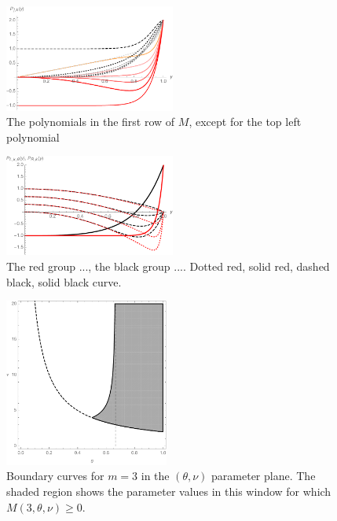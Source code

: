 \documentclass[a4paper]{article}
\newcommand{\te}{\theta}
\begin{document}
\begin{figure}
\begin{center}
\includegraphics[width=0.5\textwidth]{fig_excepttopleft.pdf}
\caption{The polynomials in the first row of $M$, except for the top left polynomial}\label{fig_excepttopleft}
\end{center}
\end{figure}

\begin{figure}
\begin{center}
\includegraphics[width=0.5\textwidth]{fig_someplpr.pdf}
\caption{The red group ..., the black group .... Dotted red, solid red, dashed black, solid black curve.}\label{fig_someplpr}
\end{center}
\end{figure}

\begin{figure}
\begin{center}
\includegraphics[width=0.48\textwidth]{fig_boundary.pdf}
\caption{Boundary curves for $m=3$ in the $(\te,\nu)$ parameter plane. The shaded region shows the parameter values in this window for which $M(3,\te,\nu)\ge 0$.}\label{fig_boundary}
\end{center}
\end{figure}
\end{document}

